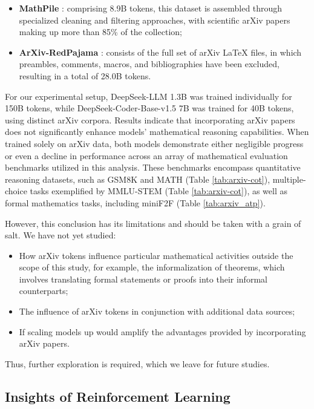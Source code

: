\begin{itemize}[topsep=0pt]
\begin{itemize}[topsep=0pt]
\begin{itemize}[topsep=0pt]
    \item \textbf{MathPile} \citep{mathpile}: comprising 8.9B tokens, this dataset is assembled through specialized cleaning and filtering approaches, with scientific arXiv papers making up more than 85\% of the collection;
    \item \textbf{ArXiv-RedPajama} \citep{redpajama}: consists of the full set of arXiv LaTeX files, in which preambles, comments, macros, and bibliographies have been excluded, resulting in a total of 28.0B tokens.
\end{itemize}

For our experimental setup, DeepSeek-LLM 1.3B was trained individually for 150B tokens, while DeepSeek-Coder-Base-v1.5 7B was trained for 40B tokens, using distinct arXiv corpora. Results indicate that incorporating arXiv papers does not significantly enhance models’ mathematical reasoning capabilities. When trained solely on arXiv data, both models demonstrate either negligible progress or even a decline in performance across an array of mathematical evaluation benchmarks utilized in this analysis. These benchmarks encompass quantitative reasoning datasets, such as GSM8K and MATH (Table \ref{tab:arxiv-cot}), multiple-choice tasks exemplified by MMLU-STEM (Table \ref{tab:arxiv-cot}), as well as formal mathematics tasks, including miniF2F (Table \ref{tab:arxiv_atp}).

However, this conclusion has its limitations and should be taken with a grain of salt. We have not yet studied:

\begin{itemize}[topsep=0pt]
    \item How arXiv tokens influence particular mathematical activities outside the scope of this study, for example, the informalization of theorems, which involves translating formal statements or proofs into their informal counterparts;
    \item The influence of arXiv tokens in conjunction with additional data sources;
    \item If scaling models up would amplify the advantages provided by incorporating arXiv papers.
\end{itemize}

Thus, further exploration is required, which we leave for future studies.

\subsection{Insights of Reinforcement Learning}

\end{itemize}
\end{itemize}
